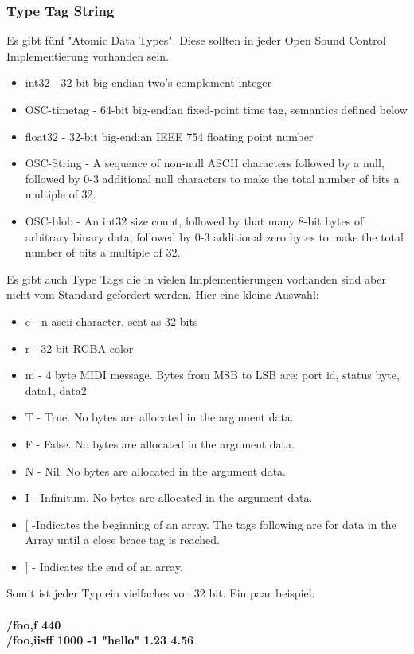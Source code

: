\documentclass[a4paper, 12pt]{article}
\begin{document}
\subsubsection{Type Tag String}
Es gibt fünf "Atomic Data Types"\cite{OSCspec}. Diese sollten in jeder Open Sound Control Implementierung vorhanden sein.
\begin{itemize}
	\item int32 - 32-bit big-endian two's complement integer
	\item OSC-timetag - 64-bit big-endian fixed-point time tag, semantics defined below
	\item float32 - 32-bit big-endian IEEE 754 floating point number
	\item OSC-String - A sequence of non-null ASCII characters followed by a null, followed by 0-3 additional null characters to make the total number of bits a multiple of 32.
	\item OSC-blob - An int32 size count, followed by that many 8-bit bytes of arbitrary binary data, followed by 0-3 additional zero bytes to make the total number of bits a multiple of 32.
\end{itemize}
Es gibt auch Type Tags die in vielen Implementierungen vorhanden sind aber nicht vom Standard gefordert werden. Hier eine kleine Auswahl\cite{OSCspec}:
\begin{itemize}
\item c - n ascii character, sent as 32 bits
\item r - 32 bit RGBA color
\item m - 4 byte MIDI message. Bytes from MSB to LSB are: port id, status byte, data1, data2
\item T - True. No bytes are allocated in the argument data.
\item F - False. No bytes are allocated in the argument data.
\item N - Nil. No bytes are allocated in the argument data.
\item I - Infinitum. No bytes are allocated in the argument data.
\item $ [ $  -Indicates the beginning of an array. The tags following are for data in the Array until a close brace tag is reached.
\item $ ] $ - Indicates the end of an array.
\end{itemize}

Somit ist jeder Typ ein vielfaches von 32 bit. Ein paar beispiel:\\
\\
{\bf /foo,f 440}\\
{\bf /foo,iisff 1000 -1 "hello" 1.23 4.56}\\
\end{document}
